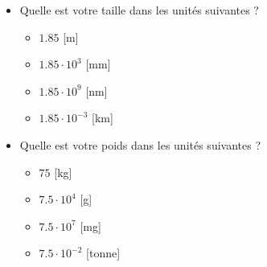 \documentclass[
  11pt,
  a4paper,
  openany]{book}
\providecommand{\tightlist}{%
  \setlength{\itemsep}{0pt}\setlength{\parskip}{0pt}}
\begin{document}
\begin{Answer}

\begin{itemize}
\tightlist
\item
  Quelle est votre taille dans les unités suivantes ?

  \begin{itemize}
  \tightlist
  \item
    \(1.85\) {[}m{]}
  \item
    \(1.85 \cdot 10^3\) {[}mm{]}
  \item
    \(1.85 \cdot 10^9\) {[}nm{]}
  \item
    \(1.85 \cdot 10^{-3}\) {[}km{]}
  \end{itemize}
\item
  Quelle est votre poids dans les unités suivantes ?

  \begin{itemize}
  \tightlist
  \item
    \(75\) {[}kg{]}
  \item
    \(7.5 \cdot 10^4\) {[}g{]}
  \item
    \(7.5 \cdot 10^7\) {[}mg{]}
  \item
    \(7.5 \cdot 10^{-2}\) {[}tonne{]}
  \end{itemize}
\end{itemize}

\end{Answer}

\newpage
\end{document}
